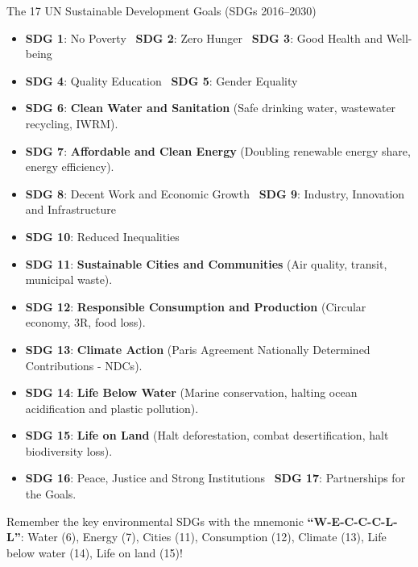 \begin{lawbox}{The 17 UN Sustainable Development Goals (SDGs 2016--2030)}
\begin{itemize}[leftmargin=1.2em]
    \item \textbf{SDG 1}: No Poverty \quad \textbullet\ \textbf{SDG 2}: Zero Hunger \quad \textbullet\ \textbf{SDG 3}: Good Health and Well-being
    \item \textbf{SDG 4}: Quality Education \quad \textbullet\ \textbf{SDG 5}: Gender Equality
    \item \textbf{SDG 6}: \textbf{Clean Water and Sanitation} (Safe drinking water, wastewater recycling, IWRM).
    \item \textbf{SDG 7}: \textbf{Affordable and Clean Energy} (Doubling renewable energy share, energy efficiency).
    \item \textbf{SDG 8}: Decent Work and Economic Growth \quad \textbullet\ \textbf{SDG 9}: Industry, Innovation and Infrastructure
    \item \textbf{SDG 10}: Reduced Inequalities
    \item \textbf{SDG 11}: \textbf{Sustainable Cities and Communities} (Air quality, transit, municipal waste).
    \item \textbf{SDG 12}: \textbf{Responsible Consumption and Production} (Circular economy, 3R, food loss).
    \item \textbf{SDG 13}: \textbf{Climate Action} (Paris Agreement Nationally Determined Contributions - NDCs).
    \item \textbf{SDG 14}: \textbf{Life Below Water} (Marine conservation, halting ocean acidification and plastic pollution).
    \item \textbf{SDG 15}: \textbf{Life on Land} (Halt deforestation, combat desertification, halt biodiversity loss).
    \item \textbf{SDG 16}: Peace, Justice and Strong Institutions \quad \textbullet\ \textbf{SDG 17}: Partnerships for the Goals.
\end{itemize}
\end{lawbox}

\begin{memorytip}
Remember the key environmental SDGs with the mnemonic \textbf{``W-E-C-C-C-L-L''}: Water (6), Energy (7), Cities (11), Consumption (12), Climate (13), Life below water (14), Life on land (15)!
\end{memorytip}
